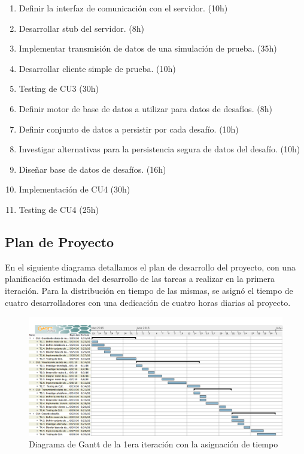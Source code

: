 \documentclass[a4paper, 10pt, twoside]{article}
\begin{document}
\begin{itemize}
\begin{enumerate}
  \item Definir la interfaz de comunicación con el servidor. (10h)
  \item Desarrollar stub del servidor. (8h)
  \item Implementar transmisión de datos de una simulación de prueba. (35h)
  \item Desarrollar cliente simple de prueba. (10h)
  \item Testing de CU3 (30h)
  \item Definir motor de base de datos a utilizar para datos de desafíos. (8h)
  \item Definir conjunto de datos a persistir por cada desafío. (10h)
  \item Investigar alternativas para la persistencia segura de datos del desafío. (10h)
  \item Diseñar base de datos de desafíos. (16h)
  \item Implementación de CU4 (30h)
  \item Testing de CU4 (25h)
\end{enumerate}
\end{itemize}

\subsection{Plan de Proyecto}

En el siguiente diagrama detallamos el plan de desarrollo del proyecto, con una planificación estimada del desarrollo de las tareas a realizar en la primera iteración. Para la distribución en tiempo de las mismas, se asignó el tiempo de cuatro desarrolladores con una dedicación de cuatro horas diarias al proyecto.


\begin{landscape}
\begin{center}
  \begin{figure}[h!]
    \includegraphics[width=25cm]{gantt.png}
    \caption{Diagrama de Gantt de la 1era iteración con la asignación de tiempo}
    \label{fig:gantt}
  \end{figure}
\end{center}
\end{landscape}
\newpage
\end{document}
